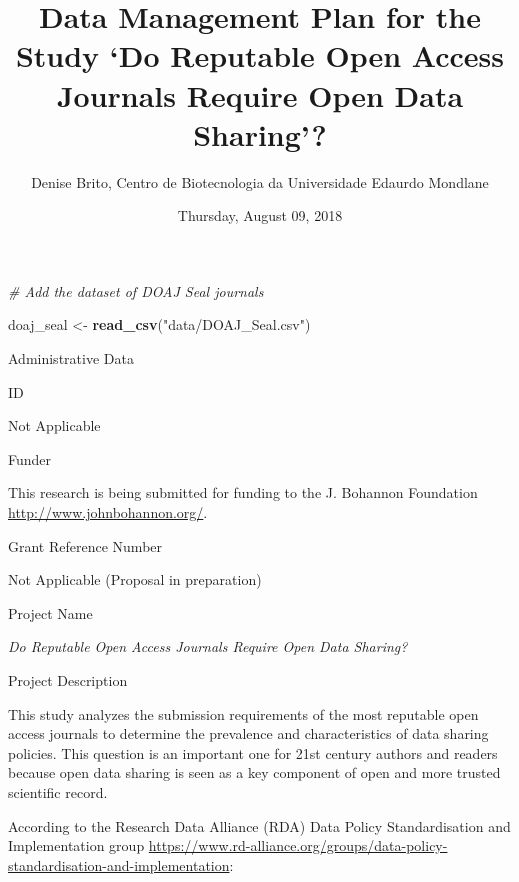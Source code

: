 \documentclass[ignorenonframetext,]{beamer}
\title{Data Management Plan for the Study `Do Reputable Open Access Journals
Require Open Data Sharing'?}
\author{Denise Brito, Centro de Biotecnologia da Universidade Edaurdo Mondlane}
\date{Thursday, August 09, 2018}
\newenvironment{Shaded}{\begin{snugshade}}{\end{snugshade}}
\newcommand{\KeywordTok}[1]{\textcolor[rgb]{0.13,0.29,0.53}{\textbf{#1}}}
\newcommand{\StringTok}[1]{\textcolor[rgb]{0.31,0.60,0.02}{#1}}
\newcommand{\CommentTok}[1]{\textcolor[rgb]{0.56,0.35,0.01}{\textit{#1}}}
\newcommand{\NormalTok}[1]{#1}
\begin{document}
\frame{\titlepage}

\begin{frame}[fragile]

\begin{Shaded}
\begin{Highlighting}[]
\CommentTok{# Add the dataset of DOAJ Seal journals}

\NormalTok{doaj_seal <-}\StringTok{ }\KeywordTok{read_csv}\NormalTok{(}\StringTok{"data/DOAJ_Seal.csv"}\NormalTok{)}
\end{Highlighting}
\end{Shaded}

\end{frame}

\begin{frame}{Administrative Data}

\begin{block}{ID}

Not Applicable

\end{block}

\begin{block}{Funder}

This research is being submitted for funding to the J. Bohannon
Foundation \url{http://www.johnbohannon.org/}.

\end{block}

\begin{block}{Grant Reference Number}

Not Applicable (Proposal in preparation)

\end{block}

\begin{block}{Project Name}

\emph{Do Reputable Open Access Journals Require Open Data Sharing?}

\begin{block}{Project Description}

This study analyzes the submission requirements of the most reputable
open access journals to determine the prevalence and characteristics of
data sharing policies. This question is an important one for 21st
century authors and readers because open data sharing is seen as a key
component of open and more trusted scientific record.

According to the Research Data Alliance (RDA) Data Policy
Standardisation and Implementation group
\url{https://www.rd-alliance.org/groups/data-policy-standardisation-and-implementation}:


\end{block}
\end{block}
\end{frame}
\end{document}
